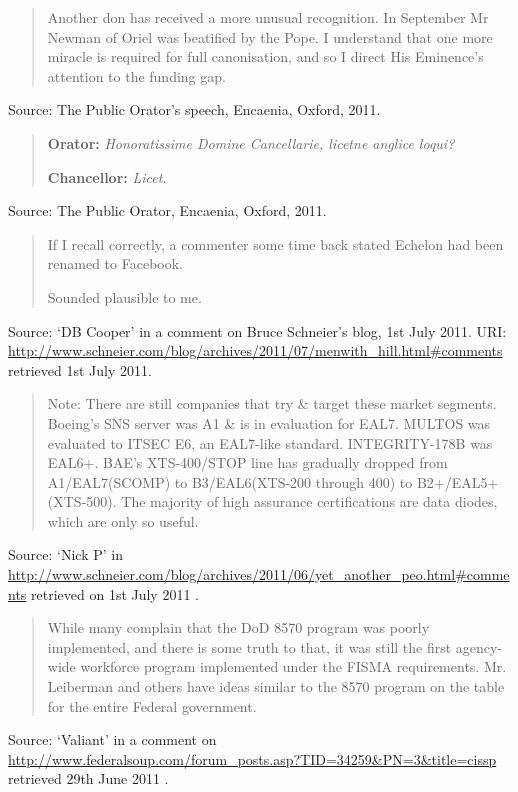 \documentclass[a4paper]{article}
\begin{document}
\begin{quote}
	Another don has received a more unusual recognition.  In September Mr Newman of Oriel was
	beatified by the Pope.  I understand that one more miracle is required for full canonisation,
	and so I direct His Eminence's attention to the funding gap.
\end{quote}
Source: The Public Orator's speech, Encaenia, Oxford, 2011.
\medskip

\begin{quote}
	\textbf{Orator:} \textit{Honoratissime Domine Cancellarie, licetne anglice loqui?}

	\textbf{Chancellor:} \textit{Licet.}
\end{quote}
Source: The Public Orator, Encaenia, Oxford, 2011.
\medskip

\begin{quote}
	If I recall correctly, a commenter some time back stated Echelon had been renamed to Facebook.

	Sounded plausible to me.
\end{quote}
Source: `DB Cooper' in a comment on Bruce Schneier's blog, 1st July 2011.
URI: \url{http://www.schneier.com/blog/archives/2011/07/menwith_hill.html#comments} retrieved 1st
July 2011.
\medskip

\begin{quote}
	Note: There are still companies that try \& target these market segments. Boeing's SNS server
was A1 \& is in evaluation for EAL7. MULTOS was evaluated to ITSEC E6, an EAL7-like standard.
INTEGRITY-178B was EAL6+. BAE's XTS-400/STOP line has gradually dropped from A1/EAL7(SCOMP) to
B3/EAL6(XTS-200 through 400) to B2+/EAL5+ (XTS-500). The majority of high assurance certifications
are data diodes, which are only so useful.
\end{quote}
Source: `Nick P' in
\url{http://www.schneier.com/blog/archives/2011/06/yet_another_peo.html#comments} retrieved on 1st
July 2011 \citep{NickP2011}.
\medskip

\begin{quote}
	While many complain that the DoD 8570 program was poorly implemented, and there is some truth
to that, it was still the first agency-wide workforce program implemented under the FISMA
requirements. Mr. Leiberman and others have ideas similar to the 8570 program on the table for the
entire Federal government.
\end{quote}
Source: `Valiant' in a comment on
\url{http://www.federalsoup.com/forum_posts.asp?TID=34259&PN=3&title=cissp} retrieved 29th June
2011 \cite[p.~3]{Valiant2011}.
\medskip
\end{document}
